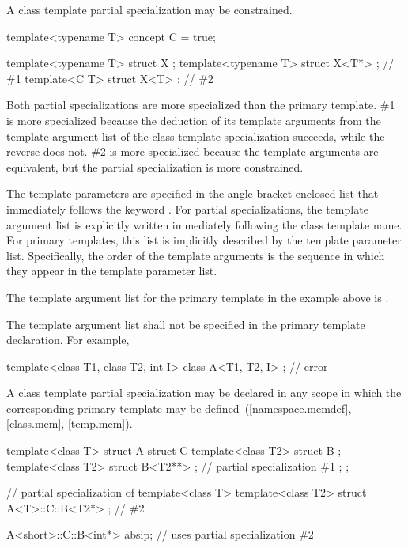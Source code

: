 \pnum
A class template partial specialization may be constrained.
\begin{example}
\begin{codeblock}
template<typename T> concept C = true;

template<typename T> struct X { };
template<typename T> struct X<T*> { };          // \#1
template<C T> struct X<T> { };                  // \#2
\end{codeblock}
Both partial specializations are more specialized than the primary template.
\#1 is more specialized because the deduction of its template arguments
from the template argument list of the class template specialization succeeds,
while the reverse does not.
\#2 is more specialized because the template arguments are equivalent,
but the partial specialization is more constrained.
\end{example}

\pnum
The template parameters are specified in the angle bracket enclosed list
that immediately follows the keyword
.
For partial specializations, the template argument list is explicitly
written immediately following the class template name.
For primary templates, this list is implicitly described by the
template parameter list.
Specifically, the order of the template arguments is the sequence in
which they appear in the template parameter list.
\begin{example}
The template argument list for the primary template in the example
above is
.
\end{example}
\begin{note}
The template argument list shall not be specified in the primary template
declaration.
For example,

\begin{codeblock}
template<class T1, class T2, int I>
class A<T1, T2, I> { };                         // error
\end{codeblock}
\end{note}

\pnum
A class template partial specialization may be declared in any
scope in which the corresponding primary template
may be defined~(\ref{namespace.memdef}, \ref{class.mem}, \ref{temp.mem}).
\begin{example}

\begin{codeblock}
template<class T> struct A {
  struct C {
    template<class T2> struct B { };
    template<class T2> struct B<T2**> { };      // partial specialization \#1
  };
};

// partial specialization of 
template<class T> template<class T2>
  struct A<T>::C::B<T2*> { };                   // \#2

A<short>::C::B<int*> absip;                     // uses partial specialization \#2
\end{codeblock}
\end{example}

